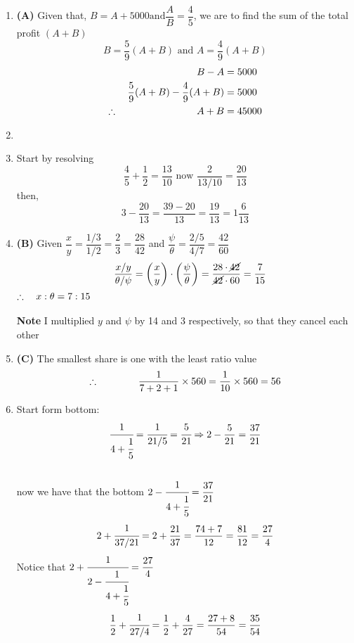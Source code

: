 \begin{multicols}{2}
\begin{enumerate}[label={\textbf{\arabic*.}}]
    \item \textbf{(A) } Given that, \(B = A + 5000 \text{and} \dfrac{A}{B} = \dfrac{4}{5}\), we are to find the sum 
    of the total profit $\left( A + B\right)$
    \[B = \dfrac{5}{9}(A + B) \text{ and } A = \dfrac{4}{9}(A + B)\]
    \begin{align*}
        B - A &= 5000 \\
        \dfrac{5}{9}(A + B) - \dfrac{4}{9}(A + B) &= 5000 \\
        \therefore \hspace{80px}  A + B &= 45000
    \end{align*}
    \item 
    \item Start by resolving \\
    \[ \dfrac{4}{5} + \dfrac{1}{2} = \dfrac{13}{10}\text{ now }  \dfrac{2}{13/10} = \dfrac{20}{13} \] 
    then, \\
    \[3 - \dfrac{20}{13} = \dfrac{39 - 20}{13} = \dfrac{19}{13} = 1\dfrac{6}{13} \]
    \item \textbf{(B)} Given $\dfrac{x}{y} = \dfrac{1/3}{1/2} = \dfrac{2}{3} = \dfrac{28}{42}$ and $\dfrac{\psi}{\theta} = \dfrac{2/5}{4/7} = \dfrac{42}{60}$ \\
    \[ \hspace{10px} \dfrac{x/y}{\theta / \psi} = \left(\dfrac{x}{y}\right) \cdot \left(\dfrac{\psi}{\theta}\right) = \dfrac{28 \cdot \cancel{42}}{\cancel{42} \cdot 60} = \dfrac{7}{15}  \]
    \(\therefore \hspace{10px} x:\theta = 7:15\) \\\\
    \textbf{Note} I multiplied $y$ and $\psi$ by 14 and 3 respectively, so that they cancel each other

    \item \textbf{(C)} The smallest share is one with the least ratio value \\
    \[ \therefore \hspace{40px} \dfrac{1}{7+2+1} \times 560 = \dfrac{1}{10} \times 560 = 56\]
    \item Start form bottom: \\
    \[\cfrac{1}{4 + \cfrac{1}{5}}  = \cfrac{1}{ 21/5} = \cfrac{5}{21} \Rightarrow 2 - \dfrac{5}{21} = \dfrac{37}{21}\] \\
    now we have that the bottom \(2 - \cfrac{1}{4 + \cfrac{1}{5}} = \dfrac{37}{21}\) \vspace{3pt}
    \[2 + \cfrac{ 1 }{37/21} = 2 + \dfrac{21}{37}  = \dfrac{74 + 7}{12} = \dfrac{81}{12} = \dfrac{27}{4}\]
    Notice that \(2 + \cfrac{1}{2 - \cfrac{1}{4 + \cfrac{1}{5}}} = \dfrac{27}{4}\) \vspace{3pt}
    \[\dfrac{1}{2} + \cfrac{1}{27/4} = \dfrac{1}{2} + \dfrac{4}{27} = \dfrac{27 + 8}{54} = \dfrac{35}{54} \]


\end{enumerate}
\end{multicols}
